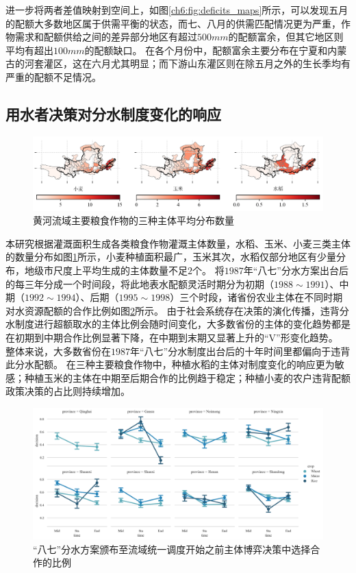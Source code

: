 进一步将两者差值映射到空间上，如图\ref{ch6:fig:deficits_maps}所示，可以发现五月的配额大多数地区属于供需平衡的状态，而七、八月的供需匹配情况更为严重，作物需求和配额供给之间的差异部分地区有超过$500mm$的配额富余，但其它地区则平均有超出$100mm$的配额缺口。
在各个月份中，配额富余主要分布在宁夏和内蒙古的河套灌区，这在六月尤其明显；而下游山东灌区则在除五月之外的生长季均有严重的配额不足情况。

\subsection{用水者决策对分水制度变化的响应}

\begin{figure}[htb]
    \centering
    \includegraphics[width=\textwidth]{img/ch6/ch6_agents.png}
    \caption{黄河流域主要粮食作物的三种主体平均分布数量}\label{ch6:fig:agents}
\end{figure}

本研究根据灌溉面积生成各类粮食作物灌溉主体数量，水稻、玉米、小麦三类主体的数量分布如图\ref{ch6:fig:agents}所示，小麦种植面积最广，玉米其次，水稻仅部分地区有少量分布，地级市尺度上平均生成的主体数量不足$2$个。
将$1987$年“八七”分水方案出台后的每三年分成一个时间段，将此地表水配额灵活时期分为初期（$1988 \sim 1991$）、中期（$1992 \sim 1994$）、后期（$1995 \sim 1998$）三个时段，诸省份农业主体在不同时期对水资源配额的合作比例如图\ref{ch6:fig:compliacne}所示。
由于社会系统存在决策的演化传播，违背分水制度进行超额取水的主体比例会随时间变化，大多数省份的主体的变化趋势都是在初期到中期合作比例显著下降，在中期到末期又显著上升的“V”形变化趋势。
整体来说，大多数省份在$1987$年“八七”分水制度出台后的十年时间里都偏向于违背此分水配额。
在三种主要粮食作物中，种植水稻的主体对制度变化的响应更为敏感；种植玉米的主体在中期至后期合作的比例趋于稳定；种植小麦的农户违背配额政策决策的占比则持续增加。


\begin{figure}[htb]
    \centering
    \includegraphics[width=\textwidth]{img/ch6/ch6_compliance.png}
    \caption{“八七”分水方案颁布至流域统一调度开始之前主体博弈决策中选择合作的比例}\label{ch6:fig:compliacne}
\end{figure}

